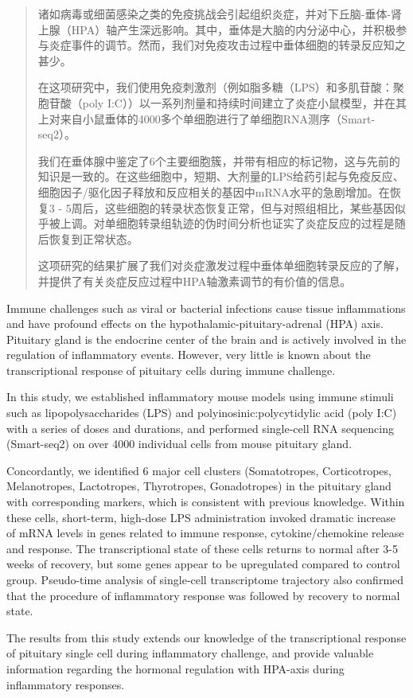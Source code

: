 
\begin{abstract}
  诸如病毒或细菌感染之类的免疫挑战会引起组织炎症，并对下丘脑-垂体-肾上腺（HPA）轴产生深远影响。其中，垂体是大脑的内分泌中心，并积极参与炎症事件的调节。然而，我们对免疫攻击过程中垂体细胞的转录反应知之甚少。

  在这项研究中，我们使用免疫刺激剂（例如脂多糖（LPS）和多肌苷酸：聚胞苷酸（poly I:C））以一系列剂量和持续时间建立了炎症小鼠模型，并在其上对来自小鼠垂体的4000多个单细胞进行了单细胞RNA测序（Smart-seq2）。

  我们在垂体腺中鉴定了6个主要细胞簇，并带有相应的标记物，这与先前的知识是一致的。在这些细胞中，短期、大剂量的LPS给药引起与免疫反应、细胞因子/驱化因子释放和反应相关的基因中mRNA水平的急剧增加。在恢复3 - 5周后，这些细胞的转录状态恢复正常，但与对照组相比，某些基因似乎被上调。对单细胞转录组轨迹的伪时间分析也证实了炎症反应的过程是随后恢复到正常状态。

  这项研究的结果扩展了我们对炎症激发过程中垂体单细胞转录反应的了解，并提供了有关炎症反应过程中HPA轴激素调节的有价值的信息。
\end{abstract}

\begin{abstract*}
  Immune challenges such as viral or bacterial infections cause tissue inflammations and have profound effects on the hypothalamic-pituitary-adrenal (HPA) axis. Pituitary gland is the endocrine center of the brain and is actively involved in the regulation of inflammatory events. However, very little is known about the transcriptional response of pituitary cells during immune challenge.

  In this study, we established inflammatory mouse models using immune stimuli such as lipopolysaccharides (LPS) and polyinosinic:polycytidylic acid (poly I:C) with a series of doses and durations, and performed single-cell RNA sequencing (Smart-seq2) on over 4000 individual cells from mouse pituitary gland.

  Concordantly, we identified 6 major cell clusters (Somatotropes, Corticotropes, Melanotropes, Lactotropes, Thyrotropes, Gonadotropes) in the pituitary gland with corresponding markers, which is consistent with previous knowledge. Within these cells, short-term, high-dose LPS administration invoked dramatic increase of mRNA levels in genes related to immune response, cytokine/chemokine release and response.  The transcriptional state of these cells returns to normal after 3-5 weeks of recovery, but some genes appear to be upregulated compared to control group. Pseudo-time analysis of single-cell transcriptome trajectory also confirmed that the procedure of inflammatory response was followed by recovery to normal state.

  The results from this study extends our knowledge of the transcriptional response of pituitary single cell during inflammatory challenge, and provide valuable information regarding the hormonal regulation with HPA-axis during inflammatory responses.
\end{abstract*}

